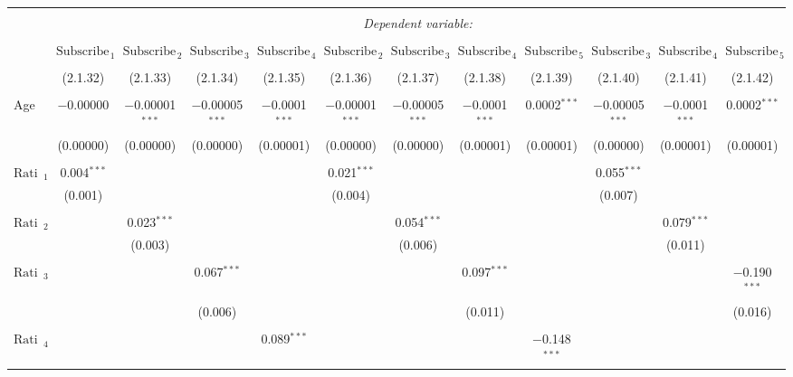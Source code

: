 
\begin{tabular}{@{\extracolsep{5pt}}lccccccccccc}
\\[-1.8ex]\hline
\hline \\[-1.8ex]
 & \multicolumn{11}{c}{\textit{Dependent variable:}} \\
\cline{2-12}
\\[-1.8ex] & $\text{Subscribers}_{1}$ & $\text{Subscribers}_{2}$ & $\text{Subscribers}_{3}$ & $\text{Subscribers}_{4}$ & $\text{Subscribers}_{2}$ & $\text{Subscribers}_{3}$ & $\text{Subscribers}_{4}$ & $\text{Subscribers}_{5}$ & $\text{Subscribers}_{3}$ & $\text{Subscribers}_{4}$ & $\text{Subscribers}_{5}$ \\
\\[-1.8ex] & (2.1.32) & (2.1.33) & (2.1.34) & (2.1.35) & (2.1.36) & (2.1.37) & (2.1.38) & (2.1.39) & (2.1.40) & (2.1.41) & (2.1.42)\\ 
\hline \\[-1.8ex]
 Age & $-$0.00000 & $-$0.00001$^{***}$ & $-$0.00005$^{***}$ & $-$0.0001$^{***}$ & $-$0.00001$^{***}$ & $-$0.00005$^{***}$ & $-$0.0001$^{***}$ & 0.0002$^{***}$ & $-$0.00005$^{***}$ & $-$0.0001$^{***}$ & 0.0002$^{***}$ \\
  & (0.00000) & (0.00000) & (0.00000) & (0.00001) & (0.00000) & (0.00000) & (0.00001) & (0.00001) & (0.00000) & (0.00001) & (0.00001) \\
  & & & & & & & & & & & \\
 $\text{Ratio}_{1}$ & 0.004$^{***}$ &  &  &  & 0.021$^{***}$ &  &  &  & 0.055$^{***}$ &  &  \\
  & (0.001) &  &  &  & (0.004) &  &  &  & (0.007) &  &  \\
  & & & & & & & & & & & \\
 $\text{Ratio}_{2}$ &  & 0.023$^{***}$ &  &  &  & 0.054$^{***}$ &  &  &  & 0.079$^{***}$ &  \\
  &  & (0.003) &  &  &  & (0.006) &  &  &  & (0.011) &  \\
  & & & & & & & & & & & \\
 $\text{Ratio}_{3}$ &  &  & 0.067$^{***}$ &  &  &  & 0.097$^{***}$ &  &  &  & $-$0.190$^{***}$ \\
  &  &  & (0.006) &  &  &  & (0.011) &  &  &  & (0.016) \\
  & & & & & & & & & & & \\
 $\text{Ratio}_{4}$ &  &  &  & 0.089$^{***}$ &  &  &  & $-$0.148$^{***}$ &  &  &  \\

\end{tabular}
